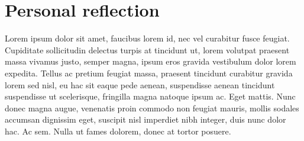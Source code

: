 \section{Personal reflection}
 Lorem ipsum dolor sit amet, faucibus lorem id, nec vel curabitur fusce feugiat. Cupiditate sollicitudin delectus turpis at tincidunt ut, lorem volutpat praesent massa vivamus justo, semper magna, ipsum eros gravida vestibulum dolor lorem expedita. Tellus ac pretium feugiat massa, praesent tincidunt curabitur gravida lorem sed nisl, eu hac sit eaque pede aenean, suspendisse aenean tincidunt suspendisse ut scelerisque, fringilla magna natoque ipsum ac. Eget mattis. Nunc donec magna augue, venenatis proin commodo non feugiat mauris, mollis sodales accumsan dignissim eget, suscipit nisl imperdiet nibh integer, duis nunc dolor hac. Ac sem. Nulla ut fames dolorem, donec at tortor posuere.
